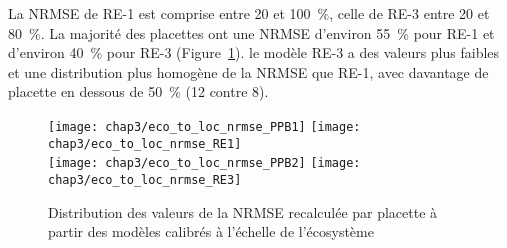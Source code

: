 La NRMSE de RE-1 est comprise entre 20 et \SI{100}{\percent}, celle de RE-3 entre 20 et \SI{80}{\percent}.
La majorité des placettes ont une NRMSE d'environ \SI{55}{\percent} pour RE-1 et d'environ \SI{40}{\percent} pour RE-3 (Figure~\ref{fig:repr_loc}).
le modèle RE-3 a des valeurs plus faibles et une distribution plus homogène de la NRMSE que RE-1, avec davantage de placette en dessous de \SI{50}{\percent} (12 contre 8).

\begin{figure}
\centering
\texttt{[image: chap3/eco\_to\_loc\_nrmse\_PPB1]}
\texttt{[image: chap3/eco\_to\_loc\_nrmse\_RE1]}\\
\texttt{[image: chap3/eco\_to\_loc\_nrmse\_PPB2]}
\texttt{[image: chap3/eco\_to\_loc\_nrmse\_RE3]}
\caption{Distribution des valeurs de la NRMSE recalculée par placette à partir des modèles calibrés à l'échelle de l'écosystème}
\label{fig:repr_loc}
\end{figure}






